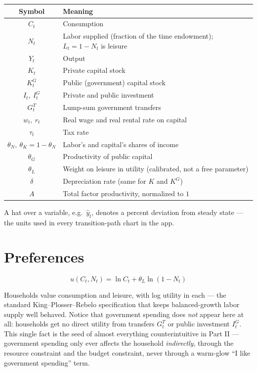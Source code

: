 \documentclass[11pt]{article}
\newcommand{\eq}[1]{\begin{equation}#1\end{equation}}
\begin{document}
\begin{center}
\begin{tabular}{cl}
\toprule
Symbol & Meaning \\
\midrule
$C_t$ & Consumption \\
$N_t$ & Labor supplied (fraction of the time endowment); $L_t=1-N_t$ is leisure \\
$Y_t$ & Output \\
$K_t$ & Private capital stock \\
$K^G_t$ & Public (government) capital stock \\
$I_t,\ I^G_t$ & Private and public investment \\
$G^T_t$ & Lump-sum government transfers \\
$w_t,\ r_t$ & Real wage and real rental rate on capital \\
$\tau_t$ & Tax rate \\
$\theta_N,\ \theta_K=1-\theta_N$ & Labor's and capital's shares of income \\
$\theta_G$ & Productivity of public capital \\
$\theta_L$ & Weight on leisure in utility (calibrated, not a free parameter) \\
$\delta$ & Depreciation rate (same for $K$ and $K^G$) \\
$A$ & Total factor productivity, normalized to $1$ \\
\bottomrule
\end{tabular}
\end{center}

A hat over a variable, e.g.\ $\hat y_t$, denotes a percent deviation from
steady state --- the units used in every transition-path chart in the app.

\section{Preferences}

\eq{ u(C_t,N_t) = \ln C_t + \theta_L \ln(1-N_t) }

Households value consumption and leisure, with log utility in each --- the
standard King--Plosser--Rebelo specification that keeps balanced-growth
labor supply well behaved. Notice that government spending does \emph{not}
appear here at all: households get no direct utility from transfers
$G^T_t$ or public investment $I^G_t$. This single fact is the seed of
almost everything counterintuitive in Part II --- government spending only
ever affects the household \emph{indirectly}, through the resource
constraint and the budget constraint, never through a warm-glow ``I like
government spending'' term.
\end{document}
